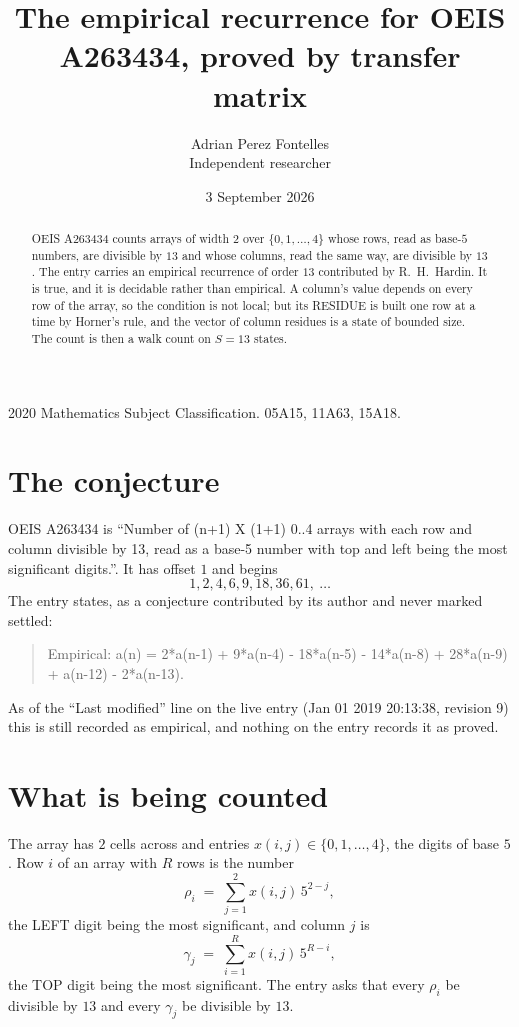 \documentclass[11pt,a4paper]{article}
\title{The empirical recurrence for OEIS A263434, proved by transfer matrix}
\author{Adrian Perez Fontelles\\ \small Independent researcher}
\date{3 September 2026}
\theoremstyle{plain}
\theoremstyle{definition}
\begin{document}
\maketitle

\begin{abstract}
OEIS A263434 counts arrays of width $2$ over $\{0,1,\dots,4\}$ whose rows, read as base-$5$
numbers, are divisible by $13$ and whose columns, read the same way, are divisible by
$13$. The entry carries an empirical recurrence of order $13$ contributed by
R.~H.~Hardin. It is true, and it is decidable rather than empirical. A column's value depends on
every row of the array, so the condition is not local; but its RESIDUE is built one row at a
time by Horner's rule, and the vector of column residues is a state of bounded size. The count
is then a walk count on $S=13$ states.
\end{abstract}

\noindent\small 2020 Mathematics Subject Classification. 05A15, 11A63, 15A18.\normalsize

\section{The conjecture}

OEIS A263434 is ``Number of (n+1) X (1+1) 0..4 arrays with each row and column divisible by 13, read as a base-5 number with top and left being the most significant digits.''. It has offset $1$ and begins
\[
1, 2, 4, 6, 9, 18, 36, 61,\ \dots
\]
The entry states, as a conjecture contributed by its author and never marked settled:
\begin{quote}
Empirical: a(n) = 2*a(n-1) + 9*a(n-4) - 18*a(n-5) - 14*a(n-8) + 28*a(n-9) + a(n-12) - 2*a(n-13).
\end{quote}
As of the ``Last modified'' line on the live entry (Jan 01 2019 20:13:38, revision 9) this is still
recorded as empirical, and nothing on the entry records it as proved.

\section{What is being counted}

The array has $2$ cells across and entries $x(i,j)\in\{0,1,\dots,4\}$, the digits of
base $5$. Row $i$ of an array with $R$ rows is the number
\[
\rho_i\;=\;\sum_{j=1}^{2}x(i,j)\,5^{2-j} ,
\]
the LEFT digit being the most significant, and column $j$ is
\[
\gamma_j\;=\;\sum_{i=1}^{R}x(i,j)\,5^{R-i} ,
\]
the TOP digit being the most significant. The entry asks that every $\rho_i$ be divisible by
$13$ and every $\gamma_j$ be divisible by $13$.
\end{document}
